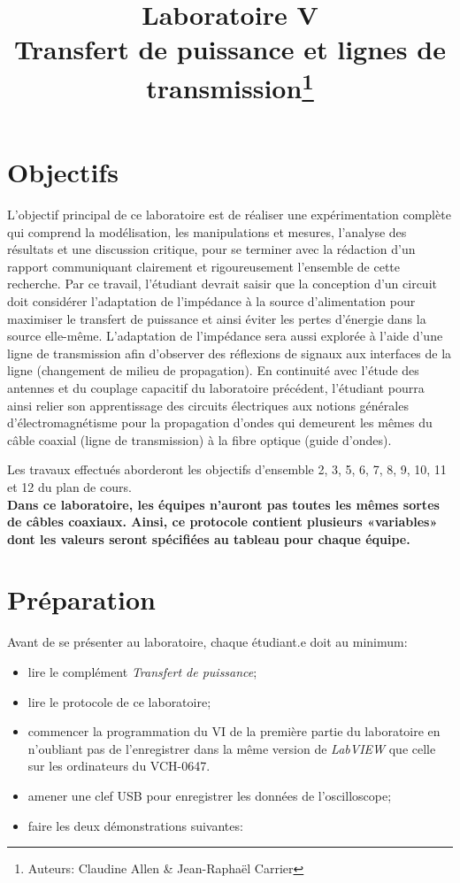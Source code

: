 \documentclass[canadien,12pt,oneside,letterpaper]{article}
\title{\textbf{Laboratoire V}\\Transfert de puissance et lignes de transmission\thanks{Auteurs: Claudine Allen \& Jean-Raphaël Carrier}}
\date{}
\begin{document}
\maketitle \vspace{-2cm}

\section{Objectifs}

L’objectif principal de ce laboratoire est de réaliser une expérimentation complète qui comprend la modélisation, les manipulations et mesures, l’analyse des résultats et une discussion critique, pour se terminer avec la rédaction d’un rapport communiquant clairement et rigoureusement l’ensemble de cette recherche. Par ce travail, l’étudiant devrait saisir que la conception d’un circuit doit considérer l’adaptation de l’impédance à la source d’alimentation pour maximiser le transfert de puissance et ainsi éviter les pertes d’énergie dans la source elle-même. L’adaptation de l’impédance sera aussi explorée à l’aide d’une ligne de transmission afin d’observer des réflexions de signaux aux interfaces de la ligne (changement de milieu de propagation). En continuité avec l’étude des antennes et du couplage capacitif du laboratoire précédent, l’étudiant pourra ainsi relier son apprentissage des circuits électriques aux notions générales d’électromagnétisme pour la propagation d’ondes qui demeurent les mêmes du câble coaxial (ligne de transmission) à la fibre optique (guide d’ondes).

Les travaux effectués aborderont les objectifs d’ensemble 2, 3, 5, 6, 7, 8, 9, 10, 11 et 12 du plan de cours.\\[8mm] \textbf{Dans ce laboratoire, les équipes n'auront pas toutes les mêmes sortes de câbles coaxiaux. Ainsi, ce protocole contient plusieurs «variables» dont les valeurs seront spécifiées au tableau pour chaque équipe.}
\vfill

\section{Préparation}

\noindent Avant de se présenter au laboratoire, chaque étudiant.e doit au minimum:
\vspace{1ex}
\begin{itemize}
\item lire le complément \textit{Transfert de puissance};
\item lire le protocole de ce laboratoire;
\item commencer la programmation du VI de la première partie du laboratoire en n'oubliant pas de l'enregistrer dans la même version de \textit{LabVIEW} que celle sur les ordinateurs du VCH-0647.
\item amener une clef USB pour enregistrer les données de l'oscilloscope;
\item faire les deux démonstrations suivantes:
\end{itemize}
\end{document}
